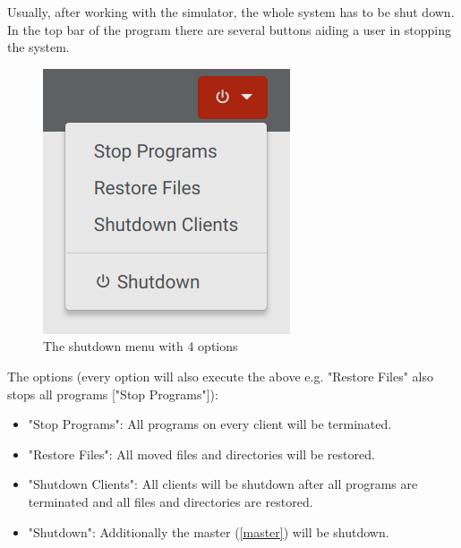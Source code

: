 \documentclass[accentcolor=tud1a, paper=a4, colorback]{tudreport}
\begin{document}
	Usually, after working with the simulator, the whole system has to be shut down. In the top
	bar of the program there are several buttons aiding a user in stopping the system.
	\begin{figure}[H]
		\centering
		\includegraphics[width=.2\textwidth]{shutdown_dropdown_menu}
		\caption{The shutdown menu with 4 options}
		\label{shutdown_dropdown_menu}
	\end{figure}
	The options (every option will also execute the above e.g. "Restore Files" also stops all programs ["Stop Programs"]):
	\begin{itemize}
		\item "Stop Programs": All programs on every client will be terminated.
		\item "Restore Files": All moved files and directories will be restored.
		\item "Shutdown Clients": All clients will be shutdown after all programs are terminated and all files and directories are restored.
		\item "Shutdown": Additionally the master (\ref{master}) will be shutdown.
	\end{itemize}
\end{document}
